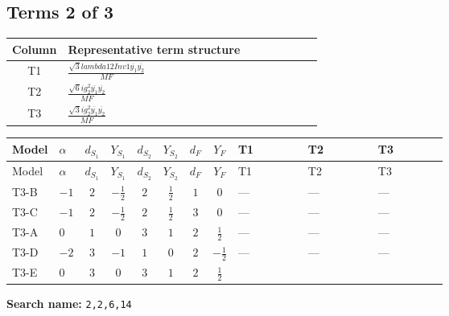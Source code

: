 \documentclass[8pt]{article}
\begin{document}
\begin{landscape}
\subsection*{Terms 2 of 3}
\begin{center}
\begin{tabular}{@{}c >{\raggedright\arraybackslash}p{0.82\linewidth}@{}}
\toprule
Column & Representative term structure \\
\midrule
T1 & \(\displaystyle \frac{\sqrt{3} lambda12Inv1 \overline{y_{1}} \overline{y_{2}}}{MF}\) \\
\midrule
T2 & \(\displaystyle \frac{\sqrt{6} i g_{2}^{2} \overline{y_{1}} \overline{y_{2}}}{MF}\) \\
\midrule
T3 & \(\displaystyle \frac{\sqrt{3} i g_{2}^{2} \overline{y_{1}} \overline{y_{2}}}{MF}\) \\
\midrule
\bottomrule
\end{tabular}
\end{center}
\smallskip
\tiny
\begin{longtable}{@{}llcccccc >{\raggedright\arraybackslash}p{0.21\linewidth} >{\raggedright\arraybackslash}p{0.21\linewidth} >{\raggedright\arraybackslash}p{0.21\linewidth}@{}}
\toprule
Model & $\alpha$ & $d_{S_1}$ & $Y_{S_1}$ & $d_{S_2}$ & $Y_{S_2}$ & $d_F$ & $Y_F$ & T1 & T2 & T3 \\
\midrule
\endfirsthead
\toprule
Model & $\alpha$ & $d_{S_1}$ & $Y_{S_1}$ & $d_{S_2}$ & $Y_{S_2}$ & $d_F$ & $Y_F$ & T1 & T2 & T3 \\
\midrule
\endhead
T3-B & $-1$ & $2$ & $-\frac{1}{2}$ & $2$ & $\frac{1}{2}$ & $1$ & $0$ & --- & --- & --- \\
\midrule
T3-C & $-1$ & $2$ & $-\frac{1}{2}$ & $2$ & $\frac{1}{2}$ & $3$ & $0$ & --- & --- & --- \\
\midrule
T3-A & $0$ & $1$ & $0$ & $3$ & $1$ & $2$ & $\frac{1}{2}$ & --- & --- & --- \\
\midrule
T3-D & $-2$ & $3$ & $-1$ & $1$ & $0$ & $2$ & $-\frac{1}{2}$ & --- & --- & --- \\
\midrule
T3-E & $0$ & $3$ & $0$ & $3$ & $1$ & $2$ & $\frac{1}{2}$ & \scriptsize\adjustbox{max width=\linewidth}{$\begin{gathered} \frac{\sqrt{3} lambda12Inv1 \overline{y_{1}} \overline{y_{2}}}{6 MF}\end{gathered}$} & \scriptsize\adjustbox{max width=\linewidth}{$\begin{gathered} \frac{\sqrt{6} i g_{2}^{2} \overline{y_{1}} \overline{y_{2}}}{3 MF}\end{gathered}$} & \scriptsize\adjustbox{max width=\linewidth}{$\begin{gathered} \frac{\sqrt{3} i g_{2}^{2} \overline{y_{1}} \overline{y_{2}}}{6 MF}\end{gathered}$} \\
\midrule
\bottomrule
\end{longtable}
\clearpage
\noindent\textbf{Search name: }\texttt{2,2,6,14}\par\smallskip

\end{landscape}
\end{document}
